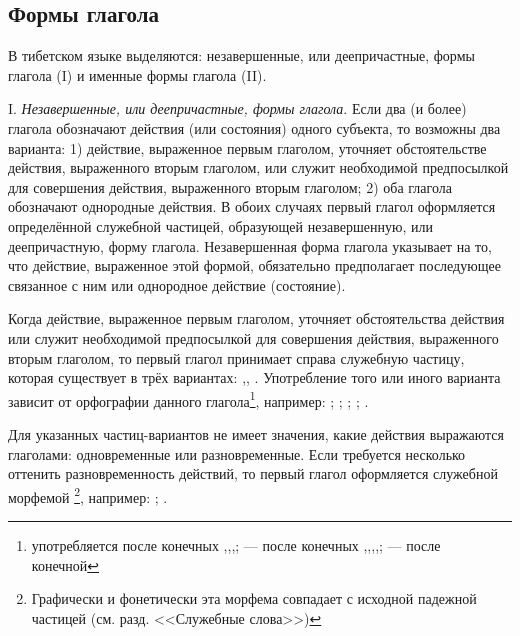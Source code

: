 \subsection{Формы глагола}

В тибетском языке выделяются: незавершенные, или деепричастные, формы глагола (I) и именные формы глагола (II).

I. \emph{Незавершенные, или деепричастные, формы глагола}. Если два (и более) глагола обозначают действия (или состояния) одного субъекта, то возможны два варианта: 1) действие, выраженное первым глаголом, уточняет обстоятельстве действия, выраженного вторым глаголом, или служит необходимой предпосылкой для совершения действия, выраженного вторым глаголом; 2) оба глагола обозначают однородные действия. В обоих случаях первый глагол оформляется определённой служебной частицей, образующей незавершенную, или деепричастную, форму глагола. Незавершенная форма глагола указывает на то, что действие, выраженное этой формой, обязательно предполагает последующее связанное с ним или однородное действие (состояние).

Когда действие, выраженное первым глаголом, уточняет обстоятельства действия или служит необходимой предпосылкой для совершения действия, выраженного вторым глаголом, то первый глагол принимает справа служебную частицу, которая существует в трёх вариантах: ,, . Употребление того или иного варианта зависит от орфографии данного глагола\footnote[36]{ употребляется после конечных ,,,;  --- после конечных ,,,,;  --- после конечной }, например:
;
;
;
;
.

Для указанных частиц-вариантов не имеет значения, какие действия выражаются глаголами: одновременные или разновременные. Если требуется несколько оттенить разновременность действий, то первый глагол оформляется служебной морфемой \footnote[37]{Графически и фонетически эта морфема совпадает с исходной падежной частицей (см. разд. <<Служебные слова>>)}, например:
;
.

